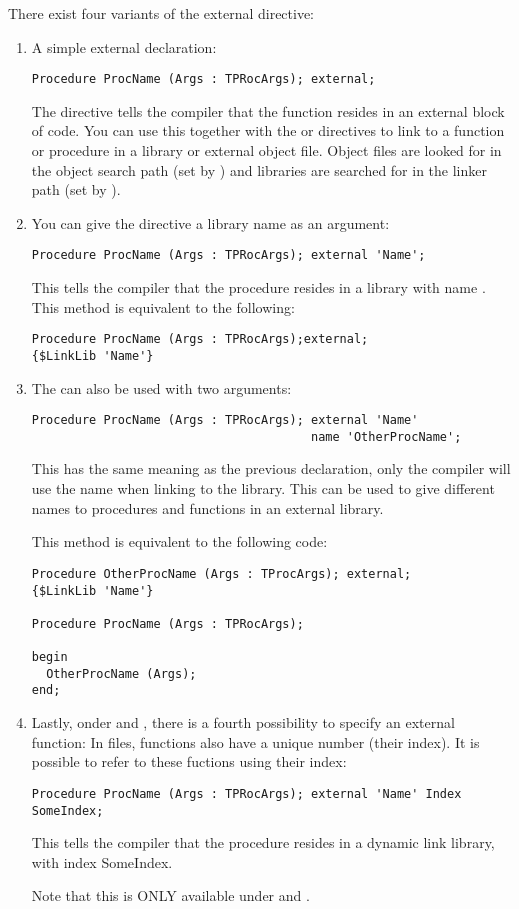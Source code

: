 There exist four variants of the external directive:
\begin{enumerate}
\item A simple external declaration:
\begin{verbatim}
Procedure ProcName (Args : TPRocArgs); external;
\end{verbatim}
The  directive tells the compiler that the function resides in
an external block of code. You can use this together with the 
or  directives to link to a function or procedure in a
library or external object file. Object files are looked for in the object
search path (set by ) and libraries are searched for in the linker
path (set by ).

\item You can give the  directive a library name as an
argument:
\begin{verbatim}
Procedure ProcName (Args : TPRocArgs); external 'Name';
\end{verbatim}
This tells the compiler that the procedure resides in a library with name
. This method is equivalent to the following:
\begin{verbatim}
Procedure ProcName (Args : TPRocArgs);external;
{$LinkLib 'Name'}
\end{verbatim}
\item The  can also be used with two arguments:
\begin{verbatim}
Procedure ProcName (Args : TPRocArgs); external 'Name'
                                       name 'OtherProcName';
\end{verbatim}
This has the same meaning as the previous declaration, only the compiler
will use the name  when linking to the library. This
can be used to give different names to procedures and functions in an
external library.

This method is equivalent to the following code:
\begin{verbatim}
Procedure OtherProcName (Args : TProcArgs); external;
{$LinkLib 'Name'}

Procedure ProcName (Args : TPRocArgs);

begin
  OtherProcName (Args);
end;
\end{verbatim}
\item Lastly, onder \windows and \ostwo, there is a fourth possibility
to specify an external function: In  files, functions also have
a unique number (their index). It is possible to refer to these fuctions
using their index:
\begin{verbatim}
Procedure ProcName (Args : TPRocArgs); external 'Name' Index SomeIndex;
\end{verbatim}
This tells the compiler that the procedure  resides in a
dynamic link library, with index {SomeIndex}.

\begin{remark}Note that this is ONLY available under \windows and \ostwo.
\end{remark}
\end{enumerate}

